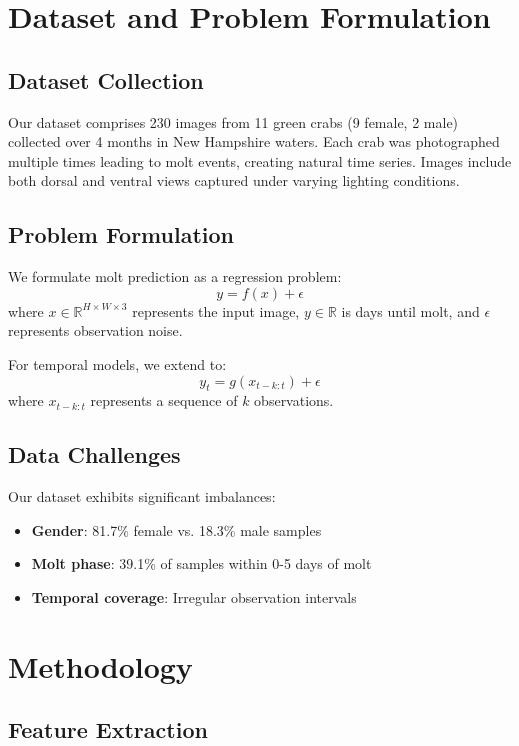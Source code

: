 \documentclass[10pt,twocolumn,letterpaper]{article}
\begin{document}
\section{Dataset and Problem Formulation}

\subsection{Dataset Collection}
Our dataset comprises 230 images from 11 green crabs (9 female, 2 male) collected over 4 months in New Hampshire waters. Each crab was photographed multiple times leading to molt events, creating natural time series. Images include both dorsal and ventral views captured under varying lighting conditions.

\subsection{Problem Formulation}
We formulate molt prediction as a regression problem:
\begin{equation}
y = f(x) + \epsilon
\end{equation}
where $x \in \mathbb{R}^{H \times W \times 3}$ represents the input image, $y \in \mathbb{R}$ is days until molt, and $\epsilon$ represents observation noise.

For temporal models, we extend to:
\begin{equation}
y_t = g(x_{t-k:t}) + \epsilon
\end{equation}
where $x_{t-k:t}$ represents a sequence of $k$ observations.

\subsection{Data Challenges}
Our dataset exhibits significant imbalances:
\begin{itemize}
\item \textbf{Gender}: 81.7\% female vs. 18.3\% male samples
\item \textbf{Molt phase}: 39.1\% of samples within 0-5 days of molt
\item \textbf{Temporal coverage}: Irregular observation intervals
\end{itemize}

\section{Methodology}

\subsection{Feature Extraction}
\end{document}
